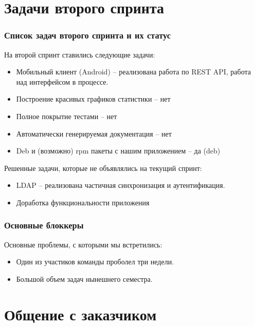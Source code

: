 \documentclass{beamer}
\newlength{\wideitemsep}
\let\olditem\item
\renewcommand{\item}{\setlength{\itemsep}{\wideitemsep}\olditem}
\begin{document}
\section{Задачи второго спринта}

\begin{frame}
\frametitle{Список задач второго спринта и их статус}

На второй спринт ставились следующие задачи:
\begin{itemize}
\item Мобильный клиент (Android) -- реализована работа по REST API, работа над интерфейсом в процессе.
\item Построение красивых графиков статистики -- нет
\item Полное покрытие тестами -- нет
\item Автоматически генерируемая документация -- нет
\item Deb и (возможно) rpm пакеты с нашим приложением -- да (deb)
\end{itemize}

Решенные задачи, которые не объявлялись на текущий спринт:
\begin{itemize}
\item LDAP -- реализована частичная синхронизация и аутентификация.
\item Доработка функциональности приложения
\end{itemize}

\end{frame}



\begin{frame}
\frametitle{Основные блоккеры}

Основные проблемы, с которыми мы встретились:
\begin{itemize}
\item Один из участиков команды проболел три недели.
\item Большой объем задач нынешнего семестра.
\end{itemize}


\end{frame}

\section{Общение с заказчиком}
\end{document}
